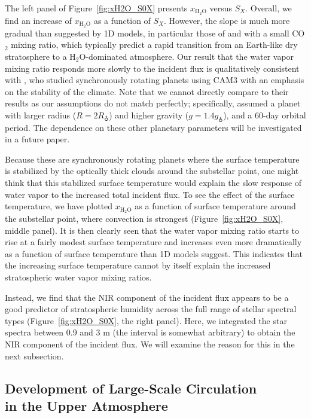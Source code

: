 \documentclass[11pt,numberedappendix,twocolappendix,]{emulateapj}
\def\water{H$_2$O}
\def\xwater{$x_\text{\water}$}
\def\wv{water vapor}
\begin{document}
The left panel of Figure~\ref{fig:xH2O_S0X} presents \xwater{} versus $S_X$. 
Overall, we find an increase of \xwater{} as a function of $S_X$. 
However, the slope is much more gradual than suggested by 1D models, in particular those  of \citet{Kasting1993} and \citet{Wordsworth2013} with a small CO$_2$ mixing ratio, which typically predict a rapid transition from an Earth-like dry stratosphere to a \water{}-dominated atmosphere. 
Our result that the \wv{} mixing ratio responds more slowly to the incident flux is qualitatively consistent with \citet{Yang2013}, who studied synchronously rotating planets using CAM3 with an emphasis on the stability of the climate. 
Note that we cannot directly compare to their results as our assumptions do not match perfectly; specifically, \cite{Yang2013} assumed a planet with larger radius ($R=2R_\earth$) and higher gravity ($g=1.4g_\earth$), and a 60-day orbital period. 
The dependence on these other planetary parameters will be investigated in a future paper. 

Because these are synchronously rotating planets where the surface temperature is stabilized by the optically thick clouds around the substellar point, one might think that this stabilized surface temperature would explain the slow  response of \wv{} to the increased total incident flux. 
To see the effect of the surface temperature, we have plotted \xwater{} as a function of surface temperature around the substellar point, where convection is strongest (Figure~\ref{fig:xH2O_S0X}, middle panel). 
It is then clearly seen that the \wv{}  mixing ratio starts to rise at a fairly modest surface temperature and increases even more dramatically as a function of surface temperature than 1D models suggest. 
This indicates that the increasing surface temperature cannot by itself explain the increased stratospheric \wv{} mixing ratios. %

Instead, we find that the NIR component of the incident flux appears to be a good predictor of stratospheric humidity across the full range of stellar spectral types (Figure~\ref{fig:xH2O_S0X}, the right panel). %
Here, we integrated the star spectra between 0.9 and 3 \textmu m (the interval is somewhat arbitrary) to obtain the NIR component of the incident flux. %
We will examine the reason for this in the next subsection.
 

\subsection{Development of Large-Scale Circulation \\in the Upper Atmosphere}
\label{ss:result_omega}
\end{document}
